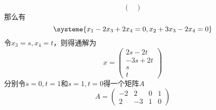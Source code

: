 \begin{solution}
\[\begin{pmatrix}
        \end{pmatrix}
    \]
    那么有
    \[
        \systeme{
            x_1 -2x_3 + 2x_4 = 0,
            x_2 + 3x_3 - 2x_4 = 0
        }
    \]
    令$x_3 = s, x_4=t$，则得通解为
    \[
        x =
        \begin{pmatrix}
            2s - 2t \\
            -3s+2t  \\
            s       \\
            t
        \end{pmatrix}
    \]
    分别令$s=0,t=1$和$s=1,t=0$得一个矩阵$A$
    \[
        A =
        \begin{pmatrix}
            -2 & 2  & 0 & 1 \\
            2  & -3 & 1 & 0
        \end{pmatrix}
    \]
\end{solution}